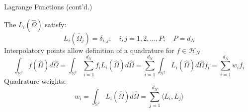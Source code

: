 \documentclass[xcolor=x11names,compress,handout]{beamer}
\renewcommand{\(}{\begin{columns}}
\renewcommand{\)}{\end{columns}}
\newcommand{\<}[1]{\begin{column}{#1}}
\renewcommand{\>}{\end{column}}
\newcommand{\vOmega}{\ensuremath{\hat{\Omega}}}
\newcommand{\hn}{\mathcal{H}_N}
\newcommand{\maths}{\mathbb{S}^2}
\newcommand{\dn}{d_N}
\newcommand{\lij}{\langle L_i,L_j \rangle}
\begin{document}


\begin{frame}{Lagrange Functions (cont'd.)}

The $L_{i}(\vOmega)$ satisfy:
\begin{equation}
L_i(\vOmega_j) = \delta_{i,j};\quad i,j = 1,2,\ldots,P;\quad P = \dn
\end{equation}
\pause
Interpolatory points allow definition of a quadrature for $f \in \hn$%
\begin{equation}
\int_{\maths}f(\vOmega)d\vOmega = \int_{\maths}\sum_{i=1}^{\dn} f_i L_i(\vOmega)d\vOmega 
= \sum_{i=1}^{\dn}\int_{\maths}L_i(\vOmega)d\vOmega f_i = \sum_{i=1}^{\dn} w_i f_i
\end{equation}
\pause
Quadrature weights:
\begin{equation}
w_i = \int_{\maths}L_{i}(\vOmega)d\vOmega = \sum_{j=1}^{\dn}\lij
\end{equation}
\end{frame}
\end{document}
